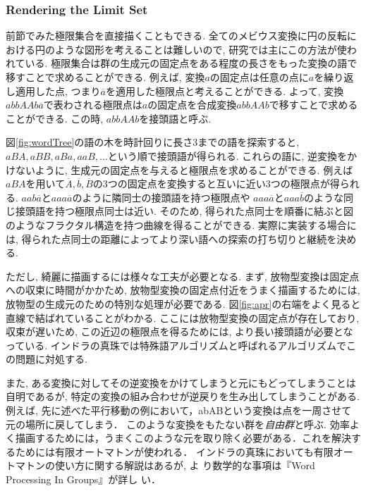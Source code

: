 \subsubsection{Rendering the Limit Set}

前節でみた極限集合を直接描くこともできる.
全てのメビウス変換に円の反転における円のような図形を考えることは難しいので, 研究では主にこの方法が使われている.
極限集合は群の生成元の固定点をある程度の長さをもった変換の語で移すことで求めることができる.
例えば, 変換$a$の固定点は任意の点に$a$を繰り返し適用した点, つまり$\overline{a}$を適用した極限点と考えることができる.
よって, 変換$abbAAb\overline{a}$で表わされる極限点は$a$の固定点を合成変換$abbAAb$で移すことで求めることができる.
この時, $abbAAb$を接頭語と呼ぶ.

図\ref{fig:wordTree}の語の木を時計回りに長さ3までの語を探索すると,$ aBA, aBB, aBa, aaB, ...$という順で接頭語が得られる.
これらの語に, 逆変換をかけないように, 生成元の固定点を与えると極限点を求めることができる.
例えば$aBA$を用いて$\overline{A}, \overline{b}, \overline{B}$の3つの固定点を変換すると互いに近い3つの極限点が得られる.
$aab\overline{a}$と$aaa\overline{a}$のように隣同士の接頭語を持つ極限点や $aaa\overline{a}$と$aaa\overline{b}$のような同じ接頭語を持つ極限点同士は近い.
そのため, 得られた点同士を順番に結ぶと図のようなフラクタル構造を持つ曲線を得ることができる.
実際に実装する場合には, 得られた点同士の距離によってより深い語への探索の打ち切りと継続を決める.

ただし, 綺麗に描画するには様々な工夫が必要となる.
まず, 放物型変換は固定点への収束に時間がかかため, 放物型変換の固定点付近をうまく描画するためには, 放物型の生成元のための特別な処理が必要である.
図\ref{fig:apr}の右端をよく見ると直線で結ばれていることがわかる.
ここには放物型変換の固定点が存在しており, 収束が遅いため, この近辺の極限点を得るためには, より長い接頭語が必要となっている.
インドラの真珠では特殊語アルゴリズムと呼ばれるアルゴリズムでこの問題に対処する.

また, ある変換に対してその逆変換をかけてしまうと元にもどってしまうことは
自明であるが, 特定の変換の組み合わせが逆戻りを生み出してしまうことがある.
例えば, 先に述べた平行移動の例において，abABという変換は点を一周させて元の場所に戻してしまう．
このような変換をもたない群を\emph{自由群}と呼ぶ.
効率よく描画するためには，うまくこのような元を取り除く必要がある．これを解決するためには有限オートマトンが使われる．
インドラの真珠においても有限オートマトンの使い方に関する解説はあるが, よ
り数学的な事項は『Word Processing In Groups』\cite{wordProcessing}が詳し
い．

